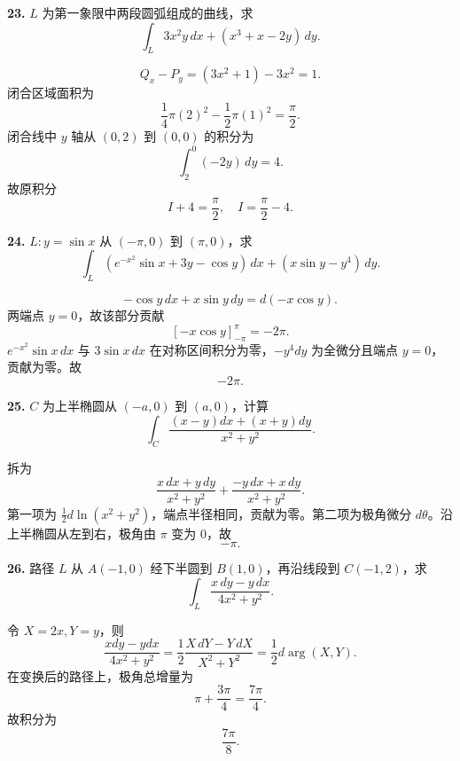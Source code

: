 \begin{problemblock}
\textbf{23.} \(L\) 为第一象限中两段圆弧组成的曲线，求
\[
\int_L3x^2y\,dx+(x^3+x-2y)\,dy.
\]
\end{problemblock}
\begin{solutionblock}
\[
Q_x-P_y=(3x^2+1)-3x^2=1.
\]
闭合区域面积为
\[
\frac14\pi(2)^2-\frac12\pi(1)^2=\frac{\pi}{2}.
\]
闭合线中 \(y\) 轴从 \((0,2)\) 到 \((0,0)\) 的积分为
\[
\int_2^0(-2y)\,dy=4.
\]
故原积分
\[
I+4=\frac{\pi}{2},
\quad
\boxed{I=\frac{\pi}{2}-4}.
\]
\end{solutionblock}

\begin{problemblock}
\textbf{24.} \(L:y=\sin x\) 从 \((- \pi,0)\) 到 \((\pi,0)\)，求
\[
\int_L(e^{-x^2}\sin x+3y-\cos y)\,dx+(x\sin y-y^4)\,dy.
\]
\end{problemblock}
\begin{solutionblock}
\[
-\cos y\,dx+x\sin y\,dy=d(-x\cos y).
\]
两端点 \(y=0\)，故该部分贡献
\[
[-x\cos y]_{-\pi}^{\pi}=-2\pi.
\]
\(e^{-x^2}\sin x\,dx\) 与 \(3\sin x\,dx\) 在对称区间积分为零，\(-y^4dy\) 为全微分且端点 \(y=0\)，贡献为零。故
\[
\boxed{-2\pi}.
\]
\end{solutionblock}

\begin{problemblock}
\textbf{25.} \(C\) 为上半椭圆从 \((-a,0)\) 到 \((a,0)\)，计算
\[
\int_C\frac{(x-y)dx+(x+y)dy}{x^2+y^2}.
\]
\end{problemblock}
\begin{solutionblock}
拆为
\[
\frac{x\,dx+y\,dy}{x^2+y^2}+\frac{-y\,dx+x\,dy}{x^2+y^2}.
\]
第一项为 \(\frac12d\ln(x^2+y^2)\)，端点半径相同，贡献为零。第二项为极角微分 \(d\theta\)。沿上半椭圆从左到右，极角由 \(\pi\) 变为 \(0\)，故
\[
\boxed{-\pi}.
\]
\end{solutionblock}

\begin{problemblock}
\textbf{26.} 路径 \(L\) 从 \(A(-1,0)\) 经下半圆到 \(B(1,0)\)，再沿线段到 \(C(-1,2)\)，求
\[
\int_L\frac{x\,dy-y\,dx}{4x^2+y^2}.
\]
\end{problemblock}
\begin{solutionblock}
令 \(X=2x,Y=y\)，则
\[
\frac{xdy-ydx}{4x^2+y^2}
=\frac12\frac{X\,dY-Y\,dX}{X^2+Y^2}
=\frac12d\arg(X,Y).
\]
在变换后的路径上，极角总增量为
\[
\pi+\frac{3\pi}{4}=\frac{7\pi}{4}.
\]
故积分为
\[
\boxed{\frac{7\pi}{8}}.
\]
\end{solutionblock}

